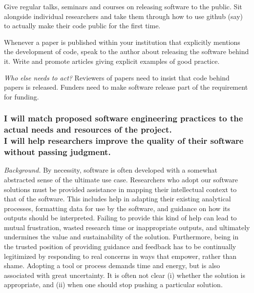 \documentclass[a4paper,UKenglish]{dagman}
\newcommand{\needlines}[1]{\Needspace{#1\baselineskip}}
\renewcommand{\paragraph}[1]{\subsubsection*{#1}\xspace}
\begin{document}
Give regular talks, seminars and courses on releasing software to the public.
Sit alongside individual researchers and take them through how to use github (say) to actually make their code public for the first time.

Whenever a paper is published within your institution that explicitly mentions the development of code, speak to the author about releasing the software behind it. Write and promote articles giving explicit examples of good practice.



\emph{Who else needs to act?}
Reviewers of papers need to insist that code behind papers is released. Funders need to make software release part of the requirement for funding.

\needlines{4}
\paragraph{I will match proposed software engineering practices to the actual needs and resources of the project. \\
I will help researchers improve the quality of their software without passing judgment.}


\emph{Background.}
By necessity, software is often developed with a somewhat abstracted sense of the ultimate use case. Researchers who adopt our software solutions must be provided assistance in mapping their intellectual context to that of the software. This includes help in adapting their existing analytical processes, formatting data for use by the software, and guidance on how its outputs should be interpreted. Failing to provide this kind of help can lead to mutual frustration, wasted research time or inappropriate outputs, and ultimately undermines the value and sustainability of the solution. Furthermore, being in the trusted position of providing guidance and feedback has to be continually legitimized by responding to real concerns in ways that empower, rather than shame. Adopting a tool or process demands time and energy, but is also associated with great uncertainty. It is often not clear (i) whether the solution is appropriate, and (ii) when one should stop pushing a particular solution.
\end{document}
